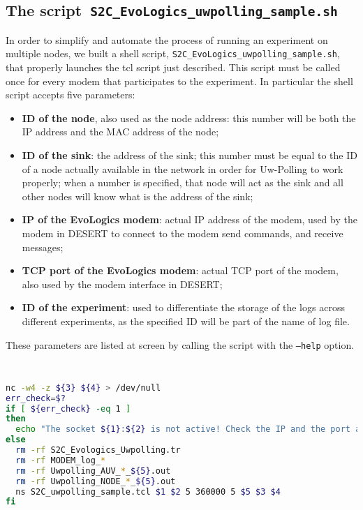 \documentclass[11pt]{article}
\begin{document}
\subsection{The script\ {\tt S2C\_EvoLogics\_uwpolling\_sample.sh}}
In order to simplify and automate the process of running an experiment on multiple nodes, we built a shell script, {\tt S2C\_EvoLogics\_uwpolling\_sample.sh}, that properly launches the tcl script just described. This script must be called once for every modem that participates to the experiment.
In particular the shell script accepts five parameters:
\begin{itemize}
  \item \textbf{ID of the node}, also used as the node address: this number will be both the IP address and the MAC address of the node;
  \item \textbf{ID of the sink}: the address of the sink; this number must be equal to the ID of a node actually available in the network in order for Uw-Polling to work properly; when a number is specified, that node will act as the sink and all other nodes will know what is the address of the sink;
  \item \textbf{IP of the EvoLogics modem}: actual IP address of the modem, used by the modem in DESERT to connect to the modem send commands, and receive messages;
  \item \textbf{TCP port of the EvoLogics modem}: actual TCP port of the modem, also used by the modem interface in DESERT;
  \item \textbf{ID of the experiment}: used to differentiate the storage of the logs across different experiments, as the specified ID will be part of the name of log file.
\end{itemize}
These parameters are listed at screen by calling the script with the {\tt --help} option.\\

{\scriptsize\tt
\begin{lstlisting}[language=bash]
nc -w4 -z ${3} ${4} > /dev/null
err_check=$?
if [ ${err_check} -eq 1 ]
then
  echo "The socket ${1}:${2} is not active! Check the IP and the port associated!"
else
  rm -rf S2C_Evologics_Uwpolling.tr
  rm -rf MODEM_log_*
  rm -rf Uwpolling_AUV_*_${5}.out
  rm -rf Uwpolling_NODE_*_${5}.out
  ns S2C_uwpolling_sample.tcl $1 $2 5 360000 5 $5 $3 $4
fi
\end{lstlisting}
}
\end{document}
